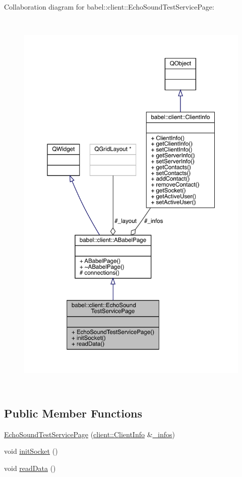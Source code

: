 Collaboration diagram for babel\+:\+:client\+:\+:Echo\+Sound\+Test\+Service\+Page\+:\nopagebreak
\begin{figure}[H]
\begin{center}
\leavevmode
\includegraphics[height=550pt]{classbabel_1_1client_1_1_echo_sound_test_service_page__coll__graph}
\end{center}
\end{figure}
\subsection*{Public Member Functions}
\begin{DoxyCompactItemize}
\item 
\mbox{\hyperlink{classbabel_1_1client_1_1_echo_sound_test_service_page_a39fd06b349d8489a89a982076733badf}{Echo\+Sound\+Test\+Service\+Page}} (\mbox{\hyperlink{classbabel_1_1client_1_1_client_info}{client\+::\+Client\+Info}} \&\mbox{\hyperlink{classbabel_1_1client_1_1_a_babel_page_aa2070ebfda878ceff938b8a60e7e2898}{\+\_\+infos}})
\item 
void \mbox{\hyperlink{classbabel_1_1client_1_1_echo_sound_test_service_page_a12bc0e4d7e2be59f58a57fce004751df}{init\+Socket}} ()
\item 
void \mbox{\hyperlink{classbabel_1_1client_1_1_echo_sound_test_service_page_aa53826e26b4b30ae45693c48614b3ea9}{read\+Data}} ()
\end{DoxyCompactItemize}
